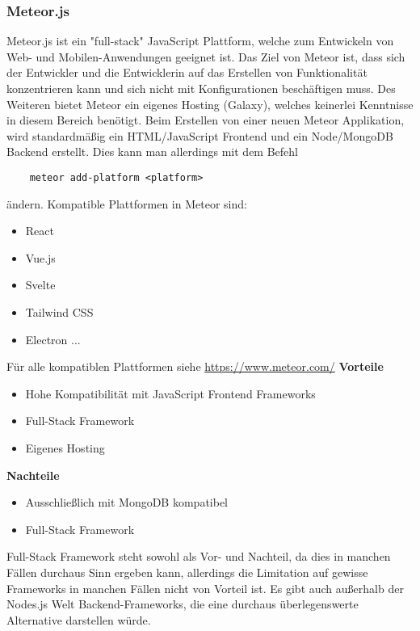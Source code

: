 \subsubsection{Meteor.js}
Meteor.js ist ein "full-stack" JavaScript Plattform, welche zum Entwickeln von Web- und Mobilen-Anwendungen geeignet ist. Das Ziel von Meteor ist, dass sich der Entwickler und die Entwicklerin auf das Erstellen von Funktionalität konzentrieren kann und sich nicht mit Konfigurationen beschäftigen muss. Des Weiteren bietet Meteor ein eigenes Hosting (Galaxy), welches keinerlei Kenntnisse in diesem Bereich benötigt. 
\newline
Beim Erstellen von einer neuen Meteor Applikation, wird standardmäßig ein HTML/JavaScript Frontend und ein Node/MongoDB Backend erstellt. Dies kann man allerdings mit dem Befehl
\begin{verbatim}
    meteor add-platform <platform>
\end{verbatim}
ändern. Kompatible Plattformen in Meteor sind:
\begin{itemize}
    \item React
    \item Vue.js
    \item Svelte
    \item Tailwind CSS
    \item Electron ...
\end{itemize}
Für alle kompatiblen Plattformen siehe \url{https://www.meteor.com/}
\newline
\textbf{Vorteile}
\begin{itemize}
    \item Hohe Kompatibilität mit JavaScript Frontend Frameworks
    \item Full-Stack Framework
    \item Eigenes Hosting
\end{itemize}
\textbf{Nachteile}
\begin{itemize}
    \item Ausschließlich mit MongoDB kompatibel
    \item Full-Stack Framework
\end{itemize}
Full-Stack Framework steht sowohl als Vor- und Nachteil, da dies in manchen Fällen durchaus Sinn ergeben kann, allerdings die Limitation auf gewisse Frameworks in manchen Fällen nicht von Vorteil ist.
\cite{backend_meteor}
\cite{backend_meteor_1}
\newline
Es gibt auch außerhalb der Nodes.js Welt Backend-Frameworks, die eine durchaus überlegenswerte Alternative darstellen würde.


